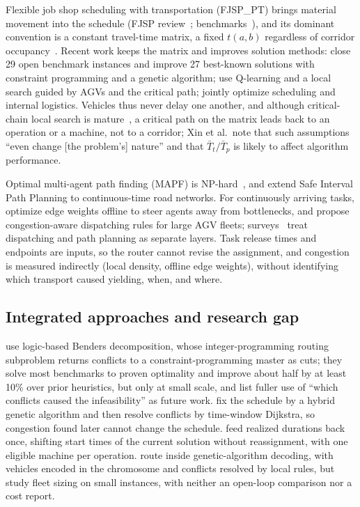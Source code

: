 \documentclass[preprint,review,12pt,authoryear]{elsarticle}
\begin{document}
Flexible job shop scheduling with transportation (FJSP\_PT) brings material movement into the schedule (FJSP review~\citep{dauzereperes2024fjsp}; benchmarks~\citep{homayouni2021production}), and its dominant convention is a constant travel-time matrix, a fixed $t(a,b)$ regardless of corridor occupancy~\citep{xin2025review}.
Recent work keeps the matrix and improves solution methods: \citet{meng2025cp} close 29 open benchmark instances and improve 27 best-known solutions with constraint programming and a genetic algorithm; \citet{qin2026knowledge} use Q-learning and a local search guided by AGVs and the critical path; \citet{jafarian2026integrated} jointly optimize scheduling and internal logistics.
Vehicles thus never delay one another, and although critical-chain local search is mature~\citep{otala2021graph,tamssaouet2023neighborhood}, a critical path on the matrix leads back to an operation or a machine, not to a corridor; Xin et al.\ note that such assumptions ``even change [the problem's] nature'' and that $\bar{T}_t/\bar{T}_p$ is likely to affect algorithm performance.

Optimal multi-agent path finding (MAPF) is NP-hard~\citep{gao2023mapf}, and \citet{kasaura2022sipp} extend Safe Interval Path Planning to continuous-time road networks.
For continuously arriving tasks, \citet{zhang2024guidance} optimize edge weights offline to steer agents away from bottlenecks, and \citet{kim2026congestion} propose congestion-aware dispatching rules for large AGV fleets; surveys~\citep{lu2022agv,fragapane2021planning} treat dispatching and path planning as separate layers.
Task release times and endpoints are inputs, so the router cannot revise the assignment, and congestion is measured indirectly (local density, offline edge weights), without identifying which transport caused yielding, when, and where.

\subsection{Integrated approaches and research gap}

 use logic-based Benders decomposition, whose integer-programming routing subproblem returns conflicts to a constraint-programming master as cuts; they solve most benchmarks to proven optimality and improve about half by at least 10\% over prior heuristics, but only at small scale, and list fuller use of ``which conflicts caused the infeasibility'' as future work.
\citet{sun2023integrated} fix the schedule by a hybrid genetic algorithm and then resolve conflicts by time-window Dijkstra, so congestion found later cannot change the schedule.
\citet{li2026framework} feed realized durations back once, shifting start times of the current solution without reassignment, with one eligible machine per operation.
\citet{lyu2019approach} route inside genetic-algorithm decoding, with vehicles encoded in the chromosome and conflicts resolved by local rules, but study fleet sizing on small instances, with neither an open-loop comparison nor a cost report.
\end{document}
